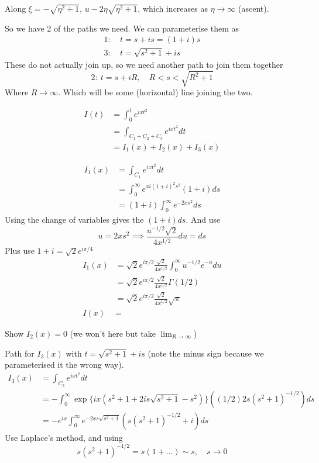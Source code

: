 \documentclass{X:/Documents/Coding/Latex/myassignment}
\begin{document}
Along $\xi = -\sqrt{\eta^2 + 1}$, $u - 2\eta\sqrt{\eta^2 +1}$, which increases as $\eta \to \infty$ (ascent).

So we have 2 of the paths we need. We can parameterise them as
\begin{align*}
    1:&\ t = s + is = (1+i)s\\
    3:&\ t = \sqrt{s^2 + 1} + is 
\end{align*}
These do not actually join up, so we need another path to join them together
\[2:\ t = s+ iR, \quad R < s < \sqrt{R^2+1}\]
Where $R\to\infty$. 
Which will be some (horizontal) line joining the two.



\begin{align*}
    I(t) &= \int_0^1 e^{ixt^2}\\
    &= \int_{C_1 + C_2 + C_3} e^{ixt^2} dt\\
    &= I_1(x) + I_2(x) + I_3(x)
\end{align*}

\begin{align*}
    I_1(x) &= \int_{C_1} e^{ixt^2} dt\\
    &= \int_0^\infty e^{xi(1+i)^2 s^2}(1+i)ds\\
    &= (1+i)\int_0^\infty e^{-2xs^2}ds 
\end{align*}
Using the change of variables gives the $(1+i)ds$. And use 
\[u = 2xs^2 \implies \frac{u^{-1/2}\sqrt{2}}{4x^{1/2}}du = ds\]
Plus use $1+i = \sqrt{2}e^{i\pi/4}$
\begin{align*}
    I_1(x) &= \sqrt{2} e^{i\pi/2} \frac{\sqrt{2}}{4x^{1/2}} \int_0^\infty u^{-1/2} e^{-u} du\\
    &= \sqrt{2} e^{i\pi/2} \frac{\sqrt{2}}{4x^{1/2}} \Gamma(1/2)\\
    &= \sqrt{2} e^{i\pi/2} \frac{\sqrt{2}}{4x^{1/2}} \sqrt{\pi}\\
    I(x) &= 
\end{align*}

Show $I_2(x) =0$ (we won't here but take $\lim_{R\to\infty}$)

Path for $I_3(x)$ with $t = \sqrt{s^2 +1} + is$ (note the minus sign because we parameterised it the wrong way).
\begin{align*}
    I_3(x) &= \int_{C_3} e^{ixt^2}dt\\
    &=- \int_0^\infty \exp\{ix(s^2 + 1 + 2is\sqrt{s^2 +1} - s^2)\}\left((1/2)2s(s^2+1)^{-1/2}\right) ds\\
    &= -e^{ix} \int_0^\infty e^{-2xs\sqrt{s^2 +1}}\left(s(s^2+1)^{-1/2} + i\right) ds
\end{align*}
Use Laplace's method, and using
\[s(s^2 +1)^{-1/2} = s(1+ \ldots) \sim s , \quad s\to 0\]
\end{document}
